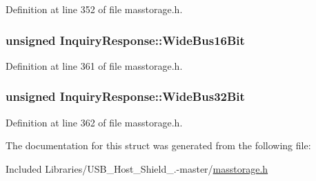 \-Definition at line 352 of file masstorage.\-h.

\hypertarget{struct_inquiry_response_a39a63fd0fd92c50370af9aefe93c13cf}{
\subsubsection[{\-Wide\-Bus16\-Bit}]{\setlength{\rightskip}{0pt plus 5cm}unsigned {\bf \-Inquiry\-Response\-::\-Wide\-Bus16\-Bit}}}\label{struct_inquiry_response_a39a63fd0fd92c50370af9aefe93c13cf}


\-Definition at line 361 of file masstorage.\-h.

\hypertarget{struct_inquiry_response_a78c6cf3387430de8176b006c4915be63}{
\subsubsection[{\-Wide\-Bus32\-Bit}]{\setlength{\rightskip}{0pt plus 5cm}unsigned {\bf \-Inquiry\-Response\-::\-Wide\-Bus32\-Bit}}}\label{struct_inquiry_response_a78c6cf3387430de8176b006c4915be63}


\-Definition at line 362 of file masstorage.\-h.



\-The documentation for this struct was generated from the following file\-:\begin{DoxyCompactItemize}
\item 
\-Included Libraries/\-U\-S\-B\-\_\-\-Host\-\_\-\-Shield\-\_.-\/master/\hyperlink{masstorage_8h}{masstorage.\-h}\end{DoxyCompactItemize}
